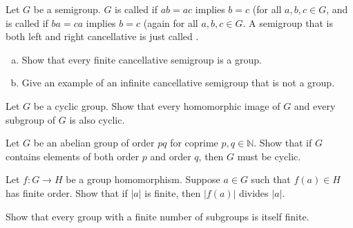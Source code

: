 \documentclass{problemset}
\begin{document}

\begin{exercise}
Let \(G\) be a semigroup. \(G\) is called  if \(ab=ac\) implies \(b=c\) (for all \(a,b,c \in G\), and is called  if \(ba=ca\) implies \(b=c\) (again for all \(a,b,c \in G\).  A semigroup that is both left and right cancellative is just called . 
\begin{enumerate}[(a)]
\item Show that every finite cancellative semigroup is a group.
\item Give an example of an infinite cancellative semigroup that is not a group.
\end{enumerate}
\end{exercise}


\begin{exercise}
Let \(G\) be a cyclic group. Show that every homomorphic image of \(G\) and every subgroup of \(G\) is also cyclic.
\end{exercise}


\begin{exercise}
Let \(G\) be an abelian group of order \(pq\) for coprime \(p,q\in \mathbb{N}\).  Show that if \(G\) contains elements of both order \(p\) and order \(q\), then \(G\) must be cyclic.
\end{exercise}


\begin{exercise}
Let \(f:G \rightarrow H\) be a group homomorphism.  Suppose \(a\in G\) such that \(f(a) \in H\) has finite order.  Show that if \(|a|\) is finite,  then \(|f(a)|\) divides \( |a|\).
\end{exercise}


\begin{exercise}
Show that every group with a finite number of subgroups is itself finite.
\end{exercise}


\end{document}
